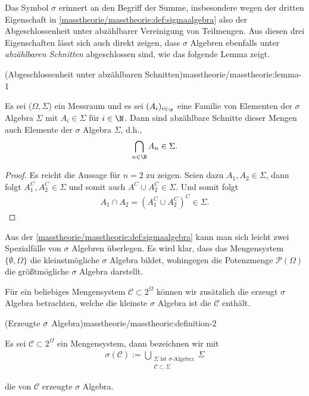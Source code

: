 \documentclass[letterpaper,10pt,german]{jupyterBook}
\begin{document}
\par
Das Symbol \(\sigma\) erinnert an den Begriff der Summe, insbesondere wegen der dritten Eigenschaft in \cref{masstheorie/masstheorie:def:sigmaalgebra}  also der Abgeschlossenheit unter abzählbarer Vereinigung von Teilmengen.
Aus diesen drei Eigenschaften lässt sich auch direkt zeigen, dass \(\sigma\) Algebren ebenfalls unter \emph{abzählbaren Schnitten} abgeschlossen sind, wie das folgende Lemma zeigt.
\begin{lemma}{(Abgeschlossenheit unter abzählbaren Schnitten)}{masstheorie/masstheorie:lemma-1}



\par
Es sei (\(\Omega,\Sigma\)) ein Messraum und es sei \((A_i)_{i\in_\N}\) eine Familie von Elementen der \(\sigma\) Algebra \(\Sigma\) mit \(A_i \in \Sigma\) für \(i \in \N\).
Dann sind abzählbare Schnitte dieser Mengen auch Elemente der \(\sigma\) Algebra \(\Sigma\), d.h.,
\begin{align*}
\bigcap_{n \in \N} A_n \in \Sigma.
\end{align*}\end{lemma}

\begin{proof}
 Es reicht die Aussage für \(n=2\) zu zeigen. Seien dazu \(A_1,A_2\in\Sigma\), dann folgt \(A_1^C,A_2^C\in\Sigma\) und somit auch \(A^C\cup A_2^C\in\Sigma\). Und somit folgt
\begin{align*}
A_1\cap A_2 = (A_1^C\cup A_2^C)^C \in \Sigma.
\end{align*}\end{proof}

\par
Aus der \cref{masstheorie/masstheorie:def:sigmaalgebra} kann man sich leicht zwei Spezialfälle von \(\sigma\) Algebren überlegen.
Es wird klar, dass das Mengensystem \(\{\emptyset, \Omega\}\) die kleinstmögliche \(\sigma\) Algebra bildet, wohingegen die Potenzmenge \(\mathcal{P}(\Omega)\) die größtmögliche \(\sigma\) Algebra darstellt.

\par
Für ein beliebiges Mengensystem \(\mathcal{C}\subset 2^\Omega\) können wir zusätzlich die erzeugt \(\sigma\) Algebra betrachten, welche die kleinste \(\sigma\) Algebra ist die \(\mathcal{C}\) enthält.
\begin{definition}{(Erzeugte \protect\(\sigma\protect\) Algebra)}{masstheorie/masstheorie:definition-2}



\par
Es sei \(\mathcal{C}\subset 2^\Omega\) ein Mengensystem, dann bezeichnen wir mit
\begin{align*}
\sigma(\mathcal{C}) := \bigcup_{\substack{\Sigma \text{ ist $\sigma$-Algebra}\\ \mathcal{C} \subset \Sigma}} \Sigma
\end{align*}
\par
die von \(\mathcal{C}\) erzeugte \(\sigma\) Algebra.
\end{definition}
\end{document}
